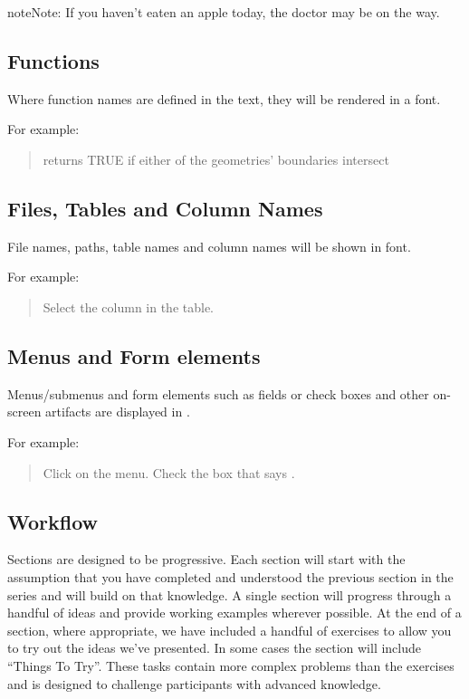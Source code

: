 \documentclass[a4paper,11pt,english]{sphinxmanual}
\begin{document}
\begin{sphinxadmonition}{note}{Note:}
If you haven’t eaten an apple today, the doctor may be on the way.
\end{sphinxadmonition}


\subsection{Functions}
\label{\detokenize{welcome:functions}}
Where function names are defined in the text, they will be rendered in a  font.

For example:
\begin{quote}

 returns TRUE if either of the geometries’ boundaries intersect
\end{quote}


\subsection{Files, Tables and Column Names}
\label{\detokenize{welcome:files-tables-and-column-names}}
File names, paths, table names and column names will be shown in  font.

For example:
\begin{quote}

Select the  column in the  table.
\end{quote}


\subsection{Menus and Form elements}
\label{\detokenize{welcome:menus-and-form-elements}}
Menus/submenus and form elements such as fields or check boxes and other on-screen artifacts are displayed in .

For example:
\begin{quote}

Click on the  menu. Check the box that says .
\end{quote}


\subsection{Workflow}
\label{\detokenize{welcome:workflow}}
Sections are designed to be progressive. Each section will start with the assumption that you have completed and understood the previous section in the series and will build on that knowledge. A single section will progress through a handful of ideas and provide working examples wherever possible. At the end of a section, where appropriate, we have included a handful of exercises to allow you to try out the ideas we’ve presented. In some cases the section will include “Things To Try”. These tasks contain more complex problems than the exercises and is designed to challenge participants with advanced knowledge.
\end{document}
